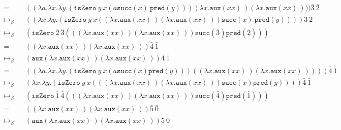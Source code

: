 \documentclass[11pt]{article}
\begin{document}
\begin{enumerate}
\begin{align*}
		      =             &  & (( \lambda a. \lambda x. \lambda y. ( \texttt{isZero} \: y \: x (a \texttt{succ}(x) \: \texttt{pred}(y)))) \lambda x. \texttt{aux}(x x) \:)( \lambda x. \texttt{aux}(x x) \:))) \bar{3} \: \bar{2} & \\
		      \mapsto_\beta &  & (( \lambda x. \lambda y. ( \texttt{isZero} \: y \: x (( \lambda x. \texttt{aux}(x x) \:)( \lambda x. \texttt{aux}(x x) \:)) \texttt{succ}(x)	\: \texttt{pred}(y)))) \bar{3} \: \bar{2}              & \\
		      \mapsto_\beta &  & ( \texttt{isZero} \: \bar{2} \: \bar{3} ((( \lambda x. \texttt{aux}(x x) \:)( \lambda x. \texttt{aux}(x x) \:)) \texttt{succ}( \bar{3} )	\texttt{pred}( \bar{2} )))                                 & \\
		      =             &  & (( \lambda x. \texttt{aux}(x x) \:)( \lambda x. \texttt{aux}(x x) \:)) \bar{4} \: \bar{1}                                                                                                                       & \\
		      \mapsto_\beta &  & ( \texttt{aux}( \lambda x. \texttt{aux}(x x) \:)( \lambda x. \texttt{aux}(x x) \:)) \bar{4} \: \bar{1}                                                                                                          & \\
		      =             &  & (( \lambda a. \lambda x. \lambda y. ( \texttt{isZero} \: y \: x (a \texttt{succ}(x) \texttt{pred}(y)))(( \lambda x. \texttt{aux}(x x) \:)( \lambda x. \texttt{aux}(x x) \:)))) \bar{4} \: \bar{1}     & \\
		      \mapsto_\beta &  & ( \lambda x. \lambda y. ( \texttt{isZero} \: y \: x ((( \lambda x. \texttt{aux}(x x) \:)( \lambda x. \texttt{aux}(x x) \:)) \texttt{succ}(x) \texttt{pred}(y)))) \bar{4} \: \bar{1}                & \\
		      \mapsto_\beta &  & ( \texttt{isZero} \: \bar{1} \: \bar{4} ((( \lambda x. \texttt{aux}(x x) \:)( \lambda x. \texttt{aux}(x x) \:)) \texttt{succ}( \bar{4} ) \texttt{pred}( \bar{1} )))                                & \\
		      =             &  & (( \lambda x. \texttt{aux}(x x) \:)( \lambda x. \texttt{aux}(x x) \:)) \bar{5} \: \bar{0}                                                                                                                       & \\
		      \mapsto_\beta &  & ( \texttt{aux}( \lambda x. \texttt{aux}(x x) \:)( \lambda x. \texttt{aux}(x x) \:)) \bar{5} \: \bar{0}                                                                                                          & \\

\end{align*}
\end{enumerate}
\end{document}
